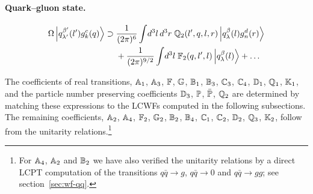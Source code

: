 \paragraph{Quark--gluon state.}
\begin{align}
\Omega\left|q^{\beta'}_{\lambda'}(l')g^{c}_{k}(q)\right\rangle\supset\;&\frac{1}{(2\pi)^{6}}\int\!d^{3}l\,d^{3}r\;
\mathbb{Q}_{2}(l',q,l,r)\left|q^{\beta}_{\lambda}(l)g^{d}_{n}(r)\right\rangle
\nonumber\\
&+\frac{1}{(2\pi)^{9/2}}\int\!d^{3}l\;\mathbb{F}_{2}(q,l',l)\left|q^{\beta}_{\lambda}(l)\right\rangle+\dots
\label{eq:Omqg}
\end{align}

The coefficients of real transitions, $\mathbb{A}_{1}$, $\mathbb{A}_{3}$, $\mathbb{F}$, $\mathbb{G}$, $\mathbb{B}_{1}$,
$\mathbb{B}_{3}$, $\mathbb{C}_{3}$, $\mathbb{C}_{4}$, $\mathbb{D}_{1}$, $\mathbb{Q}_{1}$, $\mathbb{K}_{1}$, and the particle number
preserving coefficients $\mathbb{D}_{3}$, $\mathbb{P}$, $\bar{\mathbb{P}}$, $\mathbb{Q}_{2}$ are determined by matching
these expressions to the LCWFs computed in the following subsections. The remaining coefficients,
$\mathbb{A}_{2}$, $\mathbb{A}_{4}$, $\mathbb{F}_{2}$, $\mathbb{G}_{2}$, $\mathbb{B}_{2}$, $\mathbb{B}_{4}$, $\mathbb{C}_{1}$, $\mathbb{C}_{2}$,
$\mathbb{D}_{2}$, $\mathbb{Q}_{3}$, $\mathbb{K}_{2}$, follow from the unitarity relations.\footnote{For
$\mathbb{A}_{4}$, $\mathbb{A}_{2}$ and $\mathbb{B}_{2}$ we have also verified the unitarity relations by a direct
LCPT computation of the transitions $q\bar q\to g$, $q\bar q\to0$ and $q\bar q\to gg$; see
section~\ref{sec:wf-qq}.}
